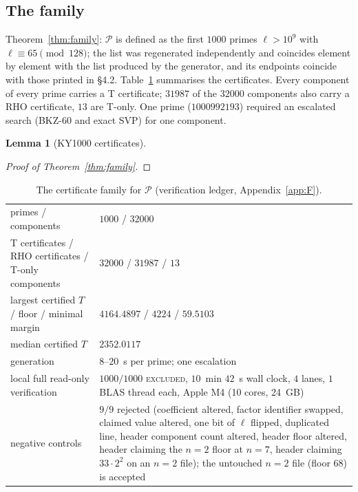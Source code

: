 \documentclass[11pt]{amsart}
\newtheorem{lemma}[theorem]{Lemma}
\theoremstyle{remark}\newtheorem{remark}[theorem]{Remark}
\theoremstyle{definition}\newtheorem{definition}[theorem]{Definition}
\providecommand{\proofsdir}{../../proofs} %
\begin{document}
\subsection{The family}\label{sec:family}
Theorem~\ref{thm:family}: $\mathcal P$ is defined as the first $1000$ primes $\ell>10^9$ with $\ell\equiv65\pmod{128}$; the list was regenerated independently and coincides element by element with the list produced by the generator, and its endpoints coincide with those printed in \cite{KY} \S4.2. Table~\ref{tab:family} summarises the certificates. Every component of every prime carries a T certificate; $31987$ of the $32000$ components also carry a RHO certificate, $13$ are T-only. One prime ($1000992193$) required an escalated search (BKZ-$60$ and exact SVP) for one component.
\begin{lemma}[KY1000 certificates]\label{lem:ky1000}

\end{lemma}
\begin{proof}[Proof of Theorem~\ref{thm:family}]

\end{proof}
\begin{table}[h]\small
\begin{tabular}{@{}p{4.2cm}p{8.0cm}@{}}\toprule
primes / components & $1000$ / $32000$\\
T certificates / RHO certificates / T-only components & $32000$ / $31987$ / $13$\\
largest certified $T$ / floor / minimal margin & $4164.4897$ / $4224$ / $59.5103$\\
median certified $T$ & $2352.0117$\\
generation & $8$--$20$~s per prime; one escalation\\
local full read-only verification & $1000/1000$ \textsc{excluded}, $10$~min $42$~s wall clock, $4$ lanes, $1$ BLAS thread each, Apple M4 (10 cores, 24~GB)\\
negative controls & $9/9$ rejected (coefficient altered, factor identifier swapped, claimed value altered, one bit of $\ell$ flipped, duplicated line, header component count altered, header floor altered, header claiming the $n=2$ floor at $n=7$, header claiming $33\cdot2^2$ on an $n=2$ file); the untouched $n=2$ file (floor $68$) is accepted\\
\bottomrule\end{tabular}
\caption{The certificate family for $\mathcal P$ (verification ledger, Appendix~\ref{app:F}).}\label{tab:family}
\end{table}
\end{document}

